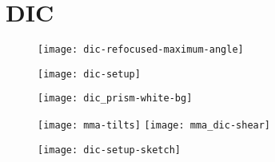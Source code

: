 \chapter{DIC}
\lstset{language=Maxima}

\citep{Schwertner2008}

\begin{figure}[htbp]
  \centering
  \texttt{[image: dic-refocused-maximum-angle]}
  \caption{}
  \label{fig:dic-refocused-maximum}
\end{figure}


\begin{figure}[htbp]
  \centering
  \texttt{[image: dic-setup]}
  \caption{}
  \label{fig:dic-setup}
\end{figure}


\begin{figure}[htbp]
  \centering
  \texttt{[image: dic\_prism-white-bg]}
  \caption{}
  \label{fig:dic_prism-white}
\end{figure}


\begin{figure}[htbp]
  \centering
  \texttt{[image: mma-tilts]}
  \texttt{[image: mma\_dic-shear]}
  \caption{}
  \label{fig:mma-tilts}
\end{figure}

\begin{figure}[htbp]
  \centering
  \texttt{[image: dic-setup-sketch]}
  \caption{}
  \label{fig:dic-setup-sketch}
\end{figure}

